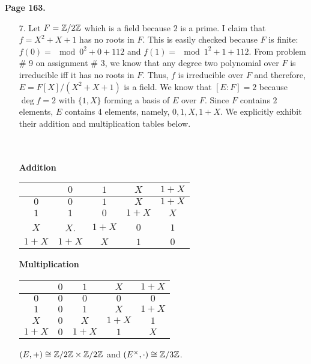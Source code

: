 \documentclass[12pt]{extarticle}
\begin{document}
\textbf{Page 163.} 
\begin{enumerate}
\item[7.] Let $F = \mathbb{Z}/2\mathbb{Z}$ which is a field because $2$ is a prime. I claim that $f = X^2 + X + 1$ has no roots in $F$. This is easily checked because $F$ is finite: $f(0) = \mod{0^2 + 0 + 1}{1}{2}$ and $f(1) = \mod{1^2 + 1 + 1}{1}{2}$. From problem \# 9 on assignment \# 3, we know that any degree two polynomial over $F$ is irreducible iff it has no roots in $F$. Thus, $f$ is irreducible over $F$ and therefore, $E = F[X]/(X^2 + X + 1)$ is a field. We know that $[E : F] = 2$ because $\deg{f} = 2$ with $\{1, X\}$ forming a basis of $E$ over $F$. Since $F$ contains $2$ elements, $E$ contains 4 elements, namely, $0, 1, X, 1 + X$. We explicitly exhibit their addition and multiplication tables below. \\ \\ \\
\begin{center}
\textbf{Addition} \\
\begin{tabular}{ c | c c c c}
  & $0$ & $1$ & $X$ & $1 + X$ \\
\hline
 $0$ & $0$ & $1$ & $X$ & $1 + X$ \\ 
 $1$ & $1$ & $0$ & $1 + X$ & $X$ \\  
 $X$ & $X$. & $1 + X$ & $0$ & $1$ \\
 $1 + X$ & $1 + X$ & $X$ & $1$ & $0$ 
\end{tabular}
\end{center}

\begin{center}
\textbf{Multiplication} \\
\begin{tabular}{ c | c c c c}
  & $0$ & $1$ & $X$ & $1 + X$ \\
\hline
 $0$ & $0$ & $0$ & $0$ & $0$ \\ 
 $1$ & $0$ & $1$ & $X$ & $1 + X$ \\  
 $X$ & $0$ & $X$ & $1 + X$ & $1$ \\
 $1 + X$ & $0$ & $1 + X$ & $1$ & $X$ 
\end{tabular}
\end{center}
$(E, +) \cong \mathbb{Z}/2\mathbb{Z} \times \mathbb{Z}/2\mathbb{Z}$ and $(E^\times, \cdot) \cong \mathbb{Z}/3\mathbb{Z}$.


\end{enumerate}
\end{document}

